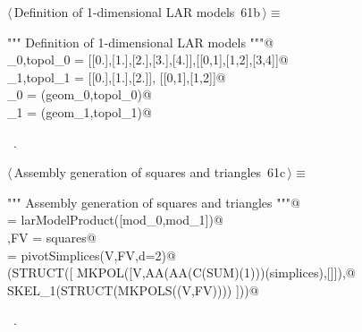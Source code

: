 \documentclass[11pt,oneside]{article}	%
\begin{document}
\begin{flushleft} \small \label{scrap119}
\protect{}$\langle\,$Definition of 1-dimensional LAR models\nobreak\ {\footnotesize 61b}$\,\rangle\equiv$
\vspace{-1ex}
\begin{list}{}{} \item
\mbox{}\verb@""" Definition of 1-dimensional LAR models  """@\\
\mbox{}\verb@geom_0,topol_0 = [[0.],[1.],[2.],[3.],[4.]],[[0,1],[1,2],[3,4]]@\\
\mbox{}\verb@geom_1,topol_1 = [[0.],[1.],[2.]], [[0,1],[1,2]]@\\
\mbox{}\verb@mod_0 = (geom_0,topol_0)@\\
\mbox{}\verb@mod_1 = (geom_1,topol_1)@\\
\mbox{}\verb@@{\NWsep}
\end{list}
\vspace{-1ex}
\footnotesize\addtolength{\baselineskip}{-1ex}
\begin{list}{}{\setlength{\itemsep}{-\parsep}\setlength{\itemindent}{-\leftmargin}}
\item \NWtxtMacroRefIn\ .
\end{list}
\end{flushleft}

\begin{flushleft} \small \label{scrap120}
\protect{}$\langle\,$Assembly generation of squares and triangles\nobreak\ {\footnotesize 61c}$\,\rangle\equiv$
\vspace{-1ex}
\begin{list}{}{} \item
\mbox{}\verb@""" Assembly generation of squares and triangles """@\\
\mbox{}\verb@squares = larModelProduct([mod_0,mod_1])@\\
\mbox{}\verb@V,FV = squares@\\
\mbox{}\verb@simplices = pivotSimplices(V,FV,d=2)@\\
\mbox{}\verb@VIEW(STRUCT([ MKPOL([V,AA(AA(C(SUM)(1)))(simplices),[]]),@\\
\mbox{}\verb@           SKEL_1(STRUCT(MKPOLS((V,FV)))) ]))@\\
\mbox{}\verb@@{\NWsep}
\end{list}
\vspace{-1ex}
\footnotesize\addtolength{\baselineskip}{-1ex}
\begin{list}{}{\setlength{\itemsep}{-\parsep}\setlength{\itemindent}{-\leftmargin}}
\item \NWtxtMacroRefIn\ .
\end{list}
\end{flushleft}
\end{document}
